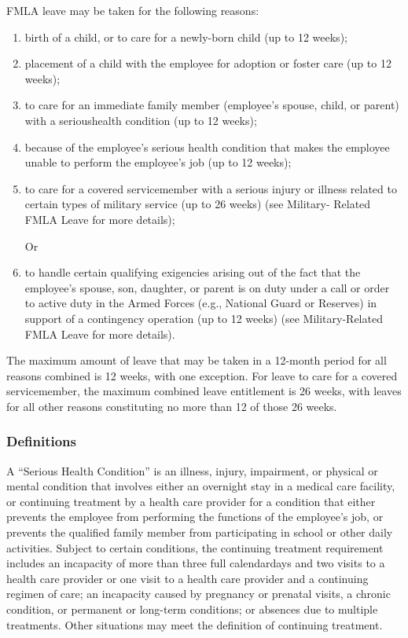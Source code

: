 FMLA leave may be taken for the following reasons:

\begin{enumerate} 	\item birth of a child, or to care for a newly-born child 	(up to 12 weeks);
	
	\item placement of a child with the employee for 	adoption or foster care (up to 12 weeks);
	
	\item to care for an immediate family member 	(employee's spouse, child, or parent) with a 	serioushealth condition (up to 12 weeks);
	
	\item because of the employee's serious health 	condition that makes the employee unable to 	perform the employee's job (up to 12 weeks);
	
	\item to care for a covered servicemember with a 	serious injury or illness related to certain types 	of military service (up to 26 weeks) (see Military- 	Related FMLA Leave for more details);
	
	Or
	
	\item to handle certain qualifying exigencies arising 	out of the fact that the employee's spouse, son, 	daughter, or parent is on duty under a call or 	order to active duty in the Armed Forces (e.g., 	National Guard or Reserves) in support of a 	contingency operation (up to 12 weeks) (see 	Military-Related FMLA Leave for more details). \end{enumerate}

The maximum amount of leave that may be taken in a 12-month period for all reasons combined is 12 weeks, with one exception. For leave to care for a covered servicemember, the maximum combined leave entitlement is 26 weeks, with leaves for all other reasons constituting no more than 12 of those 26 weeks.

\subsubsection{Definitions}

A “Serious Health Condition” is an illness, injury, impairment, or physical or mental condition that involves either an overnight stay in a medical care facility, or continuing treatment by a health care provider for a condition that either prevents the employee from performing the functions of the employee's job, or prevents the qualified family member from participating in school or other daily activities. Subject to certain conditions, the continuing treatment requirement includes an incapacity of more than three full calendardays and two visits to a health care provider or one visit to a health care provider and a continuing regimen of care; an incapacity caused by pregnancy or prenatal visits, a chronic condition, or permanent or long-term conditions; or absences due to multiple treatments. Other situations may meet the definition of continuing treatment.

